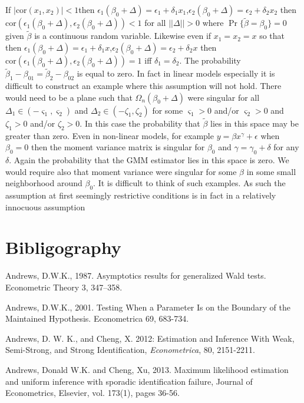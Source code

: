 \documentclass[11pt, fleqn]{article}
\begin{document}
If $|\textrm{cor}(x_1,x_2)|<1 $then  $\epsilon_1(\beta_0+\Delta)=\epsilon_1+\delta_1x_1$,$\epsilon_2(\beta_0+\Delta)=\epsilon_2+\delta_2 x_2$ then $\textrm{cor}(\epsilon_1(\beta_0+\Delta),\epsilon_2(\beta_0+\Delta))<1$ for all $|\!|\Delta|\!|>0$ where $\Pr\{\tilde{\beta}=\beta_0\}=0$ given $\tilde{\beta}$ is a continuous random variable. Likewise even if $x_1=x_2=x$ so that then $\epsilon_1(\beta_0+\Delta)=\epsilon_1+\delta_1x$,$\epsilon_2(\beta_0+\Delta)=\epsilon_2+\delta_2 x$ then $ \textrm{cor}(\epsilon_1(\beta_0+\Delta),\epsilon_2(\beta_0+\Delta))=1$  iff $\delta_1=\delta_2$. The probability $\tilde{\beta}_1-\beta_{01}=\tilde{\beta}_2-\beta_{02}$ is equal to zero. In fact in linear models especially   it is difficult to construct an example where this assumption will not hold. There would need to be a plane such that $\Omega_n(\beta_0+\Delta)$ were singular for all $\Delta_1\in (-\varsigma_1,\varsigma_2)$ and $\Delta_2\in (-\zeta_1,\zeta_2)$ for some $\varsigma_1>0$ and/or $\varsigma_2>0$ and $\zeta_1>0$ and/or $\zeta_2>0$. In this case the probability that $\tilde{\beta}$ lies in this space may be greater than zero. Even in non-linear models, for example $y=\beta x^{\gamma}+\epsilon$ when $\beta_0=0$ then the moment variance matrix is singular for $\beta_0$ and $\gamma=\gamma_0+\delta$ for any $\delta$. Again the probability that the GMM estimator lies in this space is zero. We would require also that moment variance were singular for some $\beta$ in some small neighborhood around $\beta_0$. It is difficult to think of such examples. As such the assumption at first seemingly restrictive conditions is in fact in a relatively innocuous assumption

\newpage

\section*{Bibligography}



Andrews, D.W.K., 1987. Asymptotics results for generalized Wald tests. Econometric Theory 3, 347–358.

Andrews, D.W.K., 2001. Testing When a Parameter Is on the Boundary of the Maintained Hypothesis. Econometrica 69,  683-734.

Andrews, D. W. K., and Cheng, X. 2012: Estimation and Inference With Weak, Semi-Strong, and Strong Identification, \textit{Econometrica}, 80, 2151-2211.

Andrews, Donald W.K. and Cheng, Xu, 2013. Maximum likelihood estimation and uniform inference with sporadic identification failure, Journal of Econometrics, Elsevier, vol. 173(1), pages 36-56.
\end{document}
